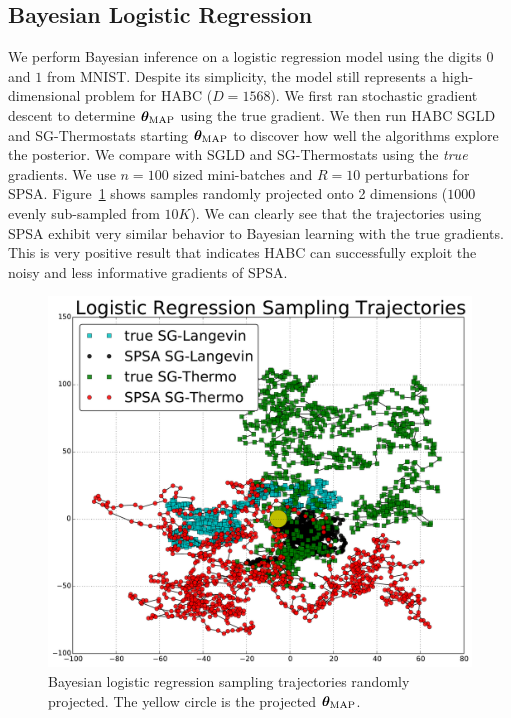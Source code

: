 \documentclass[]{article}
\begin{document}
\subsection{Bayesian Logistic Regression}\label{sec:auto}
We perform Bayesian inference on a logistic regression model using the digits $0$ and $1$ from MNIST.  Despite its simplicity, the model still represents a high-dimensional problem for HABC ($D=1568$).  We first ran stochastic gradient descent to determine ${\bm \theta}_{\text{MAP}}$ using the true gradient.  We then run HABC SGLD and SG-Thermostats starting  ${\bm \theta}_{\text{MAP}}$ to discover how well the algorithms explore the posterior.  We compare with SGLD and SG-Thermostats using the {\em true} gradients.   
%
We use $n=100$ sized mini-batches and $R=10$ perturbations for SPSA.  Figure~\ref{fig:blr} shows samples randomly projected onto 2 dimensions ($1000$ evenly sub-sampled from $10K$).  We can clearly see that the trajectories using SPSA exhibit very similar behavior to Bayesian learning with the true gradients.  This is very positive result that indicates HABC can successfully exploit the noisy and less informative gradients of SPSA.
\begin{figure}[t]
\begin{center}
\includegraphics[width=0.9\columnwidth]{./images/lr/lr_trajectories.pdf}
\vspace{-0.15in}
\caption{\small{Bayesian logistic regression sampling trajectories randomly projected.  The yellow circle is the projected ${\bm \theta}_{\text{MAP}}$.}  
}
\label{fig:blr}
\end{center}
\vskip -0.2in
\end{figure}
\end{document}
